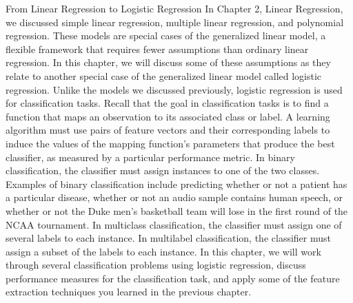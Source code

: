 From Linear Regression
to Logistic Regression
In Chapter 2, Linear Regression, we discussed simple linear regression, multiple
linear regression, and polynomial regression. These models are special cases of the
generalized linear model, a flexible framework that requires fewer assumptions
than ordinary linear regression. In this chapter, we will discuss some of these
assumptions as they relate to another special case of the generalized linear model
called logistic regression.
Unlike the models we discussed previously, logistic regression is used for classification
tasks. Recall that the goal in classification tasks is to find a function that maps an
observation to its associated class or label. A learning algorithm must use pairs of
feature vectors and their corresponding labels to induce the values of the mapping
function's parameters that produce the best classifier, as measured by a particular
performance metric. In binary classification, the classifier must assign instances to one
of the two classes. Examples of binary classification include predicting whether or not
a patient has a particular disease, whether or not an audio sample contains human
speech, or whether or not the Duke men's basketball team will lose in the first round
of the NCAA tournament. In multiclass classification, the classifier must assign one
of several labels to each instance. In multilabel classification, the classifier must assign
a subset of the labels to each instance. In this chapter, we will work through several
classification problems using logistic regression, discuss performance measures for the
classification task, and apply some of the feature extraction techniques you learned in
the previous chapter.
